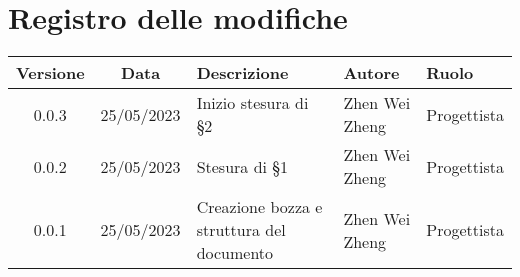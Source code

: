 \section*{Registro delle modifiche}
\begin{center}
\setlength\extrarowheight{5pt}
\renewcommand\tabularxcolumn[1]{>{\Centering}m{#1}}
\begin{tabularx}{\textwidth}{| c | c | X | X | X |} 
	\hline
	\rowcolor{white}
	\textbf{Versione} & \textbf{Data} & \textbf{Descrizione} & \textbf{Autore} & \textbf{Ruolo}\\
	\hline
	0.0.3 & 25/05/2023 & Inizio stesura di §2 & Zhen Wei Zheng & Progettista\\
	\hline
	0.0.2 & 25/05/2023 & Stesura di §1 & Zhen Wei Zheng & Progettista\\
	\hline
	0.0.1 & 25/05/2023 & Creazione bozza e struttura del documento & Zhen Wei Zheng & Progettista\\
	\hline
	\end{tabularx}
\end{center}
